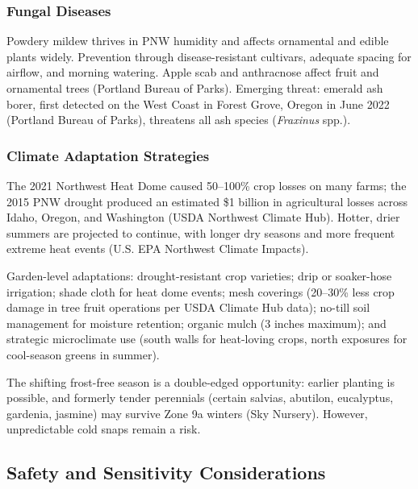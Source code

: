 \documentclass[11pt,letterpaper]{article}
\begin{document}
\subsubsection{Fungal Diseases}

Powdery mildew thrives in PNW humidity and affects ornamental and edible plants widely. Prevention through disease-resistant cultivars, adequate spacing for airflow, and morning watering. Apple scab and anthracnose affect fruit and ornamental trees (Portland Bureau of Parks). Emerging threat: emerald ash borer, first detected on the West Coast in Forest Grove, Oregon in June 2022 (Portland Bureau of Parks), threatens all ash species (\textit{Fraxinus} spp.).

\subsubsection{Climate Adaptation Strategies}

The 2021 Northwest Heat Dome caused 50--100\% crop losses on many farms; the 2015 PNW drought produced an estimated \$1 billion in agricultural losses across Idaho, Oregon, and Washington (USDA Northwest Climate Hub). Hotter, drier summers are projected to continue, with longer dry seasons and more frequent extreme heat events (U.S. EPA Northwest Climate Impacts).

Garden-level adaptations: drought-resistant crop varieties; drip or soaker-hose irrigation; shade cloth for heat dome events; mesh coverings (20--30\% less crop damage in tree fruit operations per USDA Climate Hub data); no-till soil management for moisture retention; organic mulch (3 inches maximum); and strategic microclimate use (south walls for heat-loving crops, north exposures for cool-season greens in summer).

The shifting frost-free season is a double-edged opportunity: earlier planting is possible, and formerly tender perennials (certain salvias, abutilon, eucalyptus, gardenia, jasmine) may survive Zone 9a winters (Sky Nursery). However, unpredictable cold snaps remain a risk.

\subsection{Safety and Sensitivity Considerations}
\end{document}
